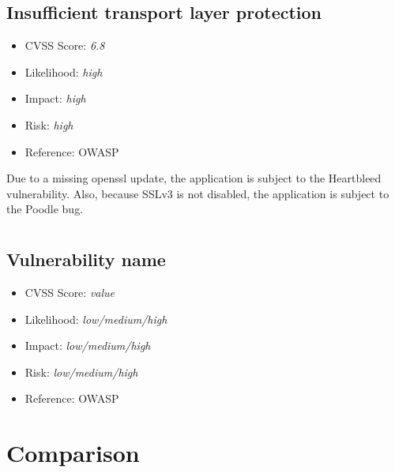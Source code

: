 \subsection{Insufficient transport layer protection} \label{over:vuln_9}
\begin{itemize}
	\item CVSS Score: \textit{6.8}
	\item Likelihood: \textit{high}
	\item Impact: \textit{high}
	\item Risk: \textit{high}
	\item Reference: OWASP 
\end{itemize}
Due to a missing openssl update, the application is subject to the Heartbleed vulnerability. Also, because SSLv3 is not disabled, the application is subject to the Poodle bug.

\section{\gnb}
\subsection{Vulnerability name} \label{over:our_test}
\begin{itemize}
	\item CVSS Score: \textit{value}
	\item Likelihood: \textit{low/medium/high}
	\item Impact: \textit{low/medium/high}
	\item Risk: \textit{low/medium/high}
	\item Reference: OWASP 
\end{itemize}
	
\section{Comparison}


